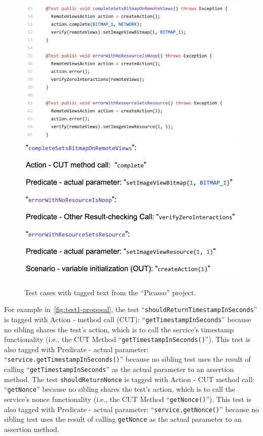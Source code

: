 \documentclass[proposal.tex]{subfiles}
\begin{document}
\begin{figure}[t]
\centering
\includegraphics[scale=0.45]{figures/sp4-proposal.png}
\includegraphics[scale=0.45]{figures/sp2-proposal.png}
\caption{Test cases with tagged text from the \enquote{Picasso} project.}
\label{fig:test2-proposal}
\end{figure}

For example in~\cref{fig:test1-proposal}, the test \enquote{\texttt{shouldReturnTimestampInSeconds}} is tagged with Action - method call (CUT): \enquote{\texttt{getTimestampInSeconds}} because no sibling shares the test’s action, which is to call the service’s timestamp functionality (i.e., the CUT Method \enquote{\texttt{getTimestampInSeconds()}}).
%
This test is also tagged with Predicate - actual parameter: \enquote{\texttt{service.getTimestampInSeconds()}} because no sibling test uses the result of calling \enquote{\texttt{getTimestampInSeconds}} as the actual parameter to an assertion method.
%
The test \texttt{shouldReturnNonce} is tagged with Action - CUT method call: \enquote{\texttt{getNonce}} because no sibling shares the test’s action, which is to call the service’s nonce functionality (i.e., the CUT Method \enquote{\texttt{getNonce()}}).
%
This test is also tagged with Predicate - actual parameter: \enquote{\texttt{service.getNonce()}} because no sibling test uses the result of calling \texttt{getNonce} as the actual parameter to an assertion method.
\end{document}
